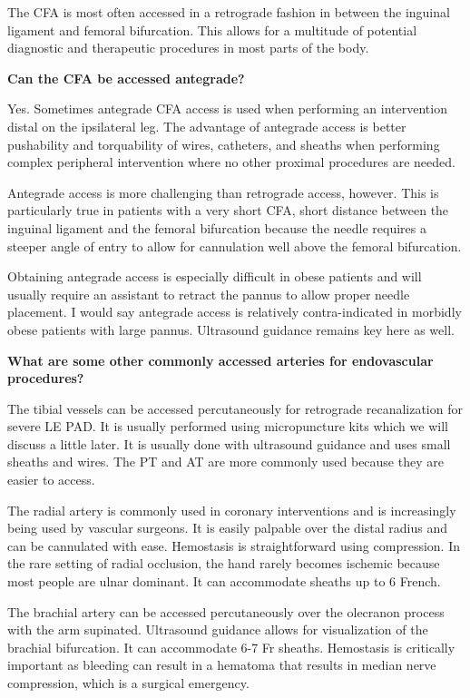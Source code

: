 \documentclass[
]{book}
\begin{document}
The CFA is most often accessed in a retrograde fashion in between the
inguinal ligament and femoral bifurcation. This allows for a multitude
of potential diagnostic and therapeutic procedures in most parts of the
body.

\textbf{Can the CFA be accessed antegrade?}

Yes. Sometimes antegrade CFA access is used when performing an
intervention distal on the ipsilateral leg. The advantage of antegrade
access is better pushability and torquability of wires, catheters, and
sheaths when performing complex peripheral intervention where no other
proximal procedures are needed.

Antegrade access is more challenging than retrograde access, however.
This is particularly true in patients with a very short CFA, short
distance between the inguinal ligament and the femoral bifurcation
because the needle requires a steeper angle of entry to allow for
cannulation well above the femoral bifurcation.

Obtaining antegrade access is especially difficult in obese patients and
will usually require an assistant to retract the pannus to allow proper
needle placement. I would say antegrade access is relatively
contra-indicated in morbidly obese patients with large pannus.
Ultrasound guidance remains key here as well.

\textbf{What are some other commonly accessed arteries for endovascular
procedures?}

The tibial vessels can be accessed percutaneously for retrograde
recanalization for severe LE PAD. It is usually performed using
micropuncture kits which we will discuss a little later. It is usually
done with ultrasound guidance and uses small sheaths and wires. The PT
and AT are more commonly used because they are easier to access.

The radial artery is commonly used in coronary interventions and is
increasingly being used by vascular surgeons. It is easily palpable over
the distal radius and can be cannulated with ease. Hemostasis is
straightforward using compression. In the rare setting of radial
occlusion, the hand rarely becomes ischemic because most people are
ulnar dominant. It can accommodate sheaths up to 6 French.

The brachial artery can be accessed percutaneously over the olecranon
process with the arm supinated. Ultrasound guidance allows for
visualization of the brachial bifurcation. It can accommodate 6-7 Fr
sheaths. Hemostasis is critically important as bleeding can result in a
hematoma that results in median nerve compression, which is a surgical
emergency.
\end{document}
